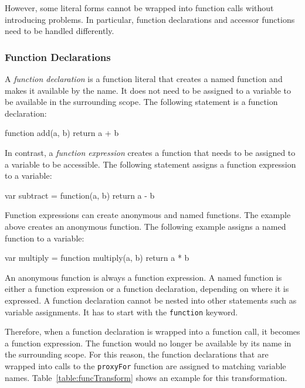 However, some literal forms cannot be wrapped into function calls without introducing problems.
In particular, function declarations and accessor functions need to be handled differently.


\subsubsection{Function Declarations}

A \emph{function declaration} is a function literal that creates a named function and makes it available by the name.
It does not need to be assigned to a variable to be available in the surrounding scope.
The following statement is a function declaration:

\begin{code}{}{}
function add(a, b) {return a + b}
\end{code}
\iffalse
\end{verbatim}\fi

In contrast, a \emph{function expression} creates a function that needs to be assigned to a variable to be accessible.
The following statement assigns a function expression to a variable:

\begin{code}{}{}
var subtract = function(a, b) {return a - b}
\end{code}
\iffalse
\end{verbatim}\fi

Function expressions can create anonymous and named functions.
The example above creates an anonymous function.
The following example assigns a named function to a variable:

\begin{code}{}{}
var multiply = function multiply(a, b) {return a * b}
\end{code}
\iffalse
\end{verbatim}\fi

An anonymous function is always a function expression.
A named function is either a function expression or a function declaration, depending on where it is expressed.
A function declaration cannot be nested into other statements such as variable assignments.
It has to start with the \lstinline{function} keyword.

Therefore, when a function declaration is wrapped into a function call, it becomes a function expression.
The function would no longer be available by its name in the surrounding scope.
For this reason, the function declarations that are wrapped into calls to the \lstinline{proxyFor} function are assigned to matching variable names.
Table~\ref{table:funcTransform} shows an example for this transformation.

